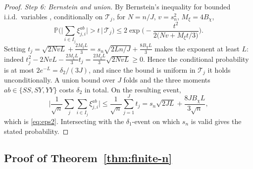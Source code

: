 \documentclass[11pt]{article}
\theoremstyle{plain}
\theoremstyle{definition}
\theoremstyle{remark}
\newcommand{\PP}{\mathbb{P}}
\begin{document}
\begin{proof}
\emph{Step 6: Bernstein and union.} By Bernstein's inequality for bounded i.i.d.\
variables \citep[Thm.~2.10]{BoucheronLugosiMassart2013}, conditionally on
$\mathcal T_j$, for $N=n/J$, $v=s_n^2$, $M_\xi=4B_\chi$,
\[
    \PP\Big(\Big|\sum_{i\in I_j}\xi^{ab}_{j,i}\Big|>t\,\Big|\,\mathcal T_j\Big)\le2\exp\Big(-\frac{t^2}{2\big(Nv+M_\xi t/3\big)}\Big).
\]
Setting $t_j=\sqrt{2NvL}+\tfrac{2M_\xi L}{3}=s_n\sqrt{2Ln/J}+\tfrac{8B_\chi L}{3}$ makes
the exponent at least $L$: indeed
$t_j^2-2NvL-\tfrac{2M_\xi L}{3}t_j=\tfrac{2M_\xi L}{3}\sqrt{2NvL}\ge0$. Hence the
conditional probability is at most $2e^{-L}=\delta_2/(3J)$, and since the bound is uniform
in $\mathcal T_j$ it holds unconditionally. A union bound over $J$ folds and the three
moments $ab\in\{SS,SY,YY\}$ costs $\delta_2$ in total. On the resulting event,
\[
    \Big|\frac{1}{\sqrt n}\sum_{j}\sum_{i\in I_j}\xi^{ab}_{j,i}\Big|\le\frac{1}{\sqrt n}\sum_{j=1}^Jt_j=s_n\sqrt{2JL}+\frac{8JB_\chi L}{3\sqrt n},
\]
which is \eqref{eq:eps2}. Intersecting with the $\delta_1$-event on which $s_n$ is valid
gives the stated probability.
\end{proof}

\subsection{Proof of Theorem~\ref{thm:finite-n}}\label{app:proof-finite-n}
\end{document}
